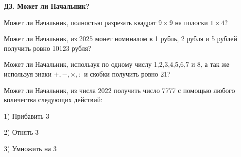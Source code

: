 \centerline{\bf \Huge ДЗ. Может ли Начальник?}
\centerline{\bf \Huge }

 Может ли Начальник, полностью разрезать квадрат $9\times9$ на полоски $1\times4$?

 Может ли Начальник, из 2025 монет номиналом в 1 рубль, 2 рубля и 5 рублей получить ровно 10123 рубля?

 Может ли Начальник, используя по одному числу 1,2,3,4,5,6,7 и 8, а так же используя знаки $+,-,\times,:$ и скобки получить ровно 21?

 Может ли Начальник, из числа 2022 получить число 7777 с помощью любого количества следующих действий:

1) Прибавить 3

2) Отнять 3

3) Умножить на 3
